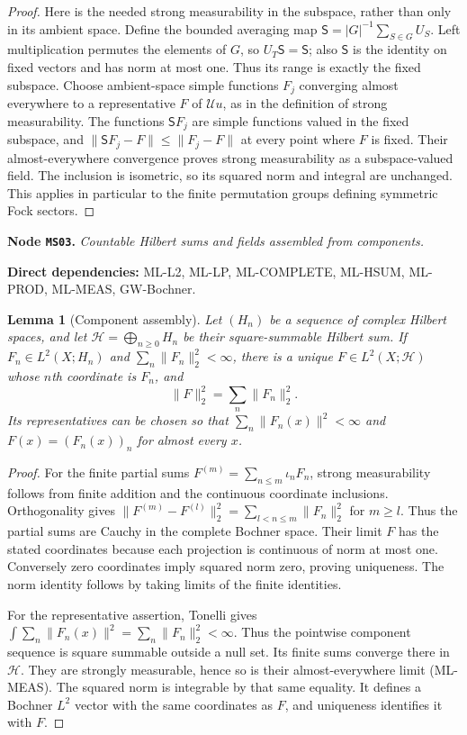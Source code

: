 \documentclass[11pt,a4paper]{article}
\newtheorem{lemma}[theorem]{Lemma}
\theoremstyle{remark}\newtheorem{remark}[theorem]{Remark}
\newcommand{\node}[3]{\par\Needspace{6\baselineskip}\smallskip\hypertarget{node:#1}{}\label{nodepage:#1}\noindent\textbf{Node \texttt{#1}.} \textit{#2.}\par\noindent\textbf{Direct dependencies:} #3.\par}
\begin{document}
\begin{proof}
Here is the needed strong measurability in the subspace, rather than only in its ambient space. Define the bounded averaging map $\mathsf S=|G|^{-1}\sum_{S\in G}U_S$. Left multiplication permutes the elements of $G$, so $U_T\mathsf S=\mathsf S$; also $\mathsf S$ is the identity on fixed vectors and has norm at most one. Thus its range is exactly the fixed subspace. Choose ambient-space simple functions $F_j$ converging almost everywhere to a representative $F$ of $\mathscr Uu$, as in the definition of strong measurability. The functions $\mathsf S F_j$ are simple functions valued in the fixed subspace, and $\|\mathsf SF_j-F\|\leq\|F_j-F\|$ at every point where $F$ is fixed. Their almost-everywhere convergence proves strong measurability as a subspace-valued field. The inclusion is isometric, so its squared norm and integral are unchanged. This applies in particular to the finite permutation groups defining symmetric Fock sectors.
\end{proof}

\node{MS03}{Countable Hilbert sums and fields assembled from components}{ML-L2, ML-LP, ML-COMPLETE, ML-HSUM, ML-PROD, ML-MEAS, GW-Bochner}
\begin{lemma}[Component assembly]\label{lem:fieldassembly}
Let $(H_n)$ be a sequence of complex Hilbert spaces, and let $\mathscr H=\bigoplus_{n\geq0}H_n$ be their square-summable Hilbert sum. If $F_n\in L^2(X;H_n)$ and $\sum_n\|F_n\|_2^2<\infty$, there is a unique $F\in L^2(X;\mathscr H)$ whose $n$th coordinate is $F_n$, and
\[
 \|F\|_2^2=\sum_n\|F_n\|_2^2.
\]
Its representatives can be chosen so that $\sum_n\|F_n(x)\|^2<\infty$ and $F(x)=(F_n(x))_n$ for almost every $x$.
\end{lemma}
\begin{proof}
For the finite partial sums $F^{(m)}=\sum_{n\leq m}\iota_nF_n$, strong measurability follows from finite addition and the continuous coordinate inclusions. Orthogonality gives
$\|F^{(m)}-F^{(l)}\|_2^2=\sum_{l<n\leq m}\|F_n\|_2^2$ for $m\geq l$. Thus the partial sums are Cauchy in the complete Bochner space. Their limit $F$ has the stated coordinates because each projection is continuous of norm at most one. Conversely zero coordinates imply squared norm zero, proving uniqueness. The norm identity follows by taking limits of the finite identities.

For the representative assertion, Tonelli gives
$\int\sum_n\|F_n(x)\|^2=\sum_n\|F_n\|_2^2<\infty$.
Thus the pointwise component sequence is square summable outside a null set. Its finite sums converge there in $\mathscr H$. They are strongly measurable, hence so is their almost-everywhere limit (ML-MEAS). The squared norm is integrable by that same equality. It defines a Bochner $L^2$ vector with the same coordinates as $F$, and uniqueness identifies it with $F$.
\end{proof}
\end{document}

